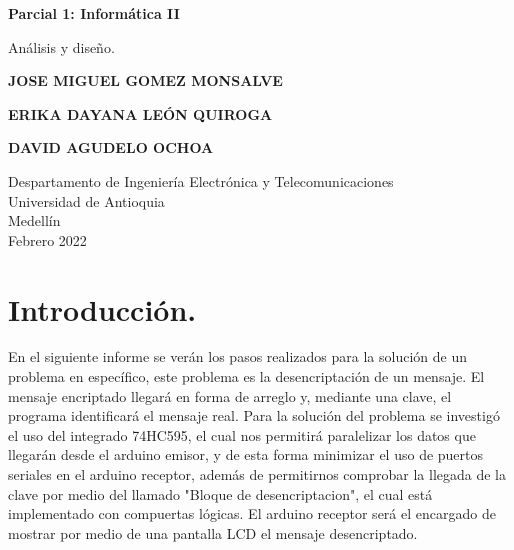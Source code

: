 \documentclass{article}
\begin{document}
\begin{titlepage}
    \begin{center}
        \vspace*{1cm}
            
        \Huge
        \textbf{Parcial 1: Informática II}
            
        \vspace{0.5cm}
        \LARGE
       Análisis y diseño.
          
            
        \vspace{6cm}
        
        \textbf{JOSE MIGUEL GOMEZ MONSALVE}
        
        \vspace{0.5cm}
        
        \textbf{ERIKA DAYANA LEÓN QUIROGA}
        
        \vspace{0.5cm}
        
        \textbf{DAVID AGUDELO OCHOA}
            

            
        \vfill
            
        \vspace{0.8cm}
       
        \Large


        \vfill
        Despartamento de Ingeniería Electrónica y Telecomunicaciones\\
        Universidad de Antioquia\\
        Medellín\\
        Febrero 2022
                 
    \end{center}
\end{titlepage}


\tableofcontents\newpage

\section{Introducción.}\label{intro}
En el siguiente informe se verán los pasos realizados para la solución de un problema en específico, este problema es la desencriptación de un mensaje. El mensaje encriptado llegará en forma de arreglo y, mediante una clave, el programa identificará el mensaje real. Para la solución del problema se investigó el uso del integrado 74HC595, el cual nos permitirá paralelizar los datos que llegarán desde el arduino emisor, y de esta forma minimizar el uso de puertos seriales en el arduino receptor, además de permitirnos comprobar la llegada de la clave por medio del llamado "Bloque de desencriptacion", el cual está implementado con compuertas lógicas. El arduino receptor será el encargado de mostrar por medio de una pantalla LCD el mensaje desencriptado.
\end{document}
